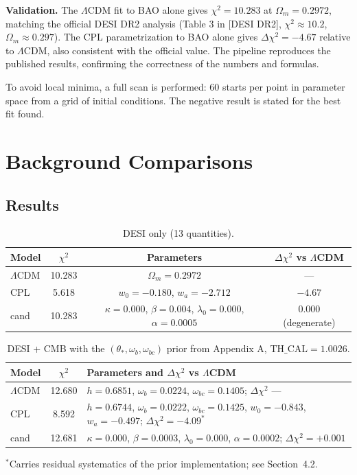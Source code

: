 \documentclass[11pt,a4paper]{article}
\begin{document}
\textbf{Validation.} The $\Lambda$CDM fit to BAO alone gives $\chi^2=10.283$ at $\Omega_m=0.2972$, matching the official DESI DR2 analysis (Table 3 in [DESI DR2], $\chi^2\approx10.2$, $\Omega_m\approx0.297$). The CPL parametrization to BAO alone gives $\Delta\chi^2=-4.67$ relative to $\Lambda$CDM, also consistent with the official value. The pipeline reproduces the published results, confirming the correctness of the numbers and formulas.

To avoid local minima, a full scan is performed: 60 starts per point in parameter space from a grid of initial conditions. The negative result is stated for the best fit found.

\section{Background Comparisons}

\subsection{Results}

\begin{table}[h]
\centering
\small
\caption{DESI only (13 quantities).}
\begin{tabular}{lccc}
\toprule
Model & $\chi^2$ & Parameters & $\Delta\chi^2$ vs $\Lambda$CDM \\
\midrule
$\Lambda$CDM & 10.283 & $\Omega_m=0.2972$ & --- \\
CPL & 5.618 & $w_0=-0.180$, $w_a=-2.712$ & $-4.67$ \\
cand & 10.283 & $\kappa=0.000$, $\beta=0.004$, $\lambda_0=0.000$, $\alpha=0.0005$ & 0.000 (degenerate) \\
\bottomrule
\end{tabular}
\end{table}

\begin{table}[h]
\centering
\small
\caption{DESI + CMB with the $(\theta_*,\omega_b,\omega_{bc})$ prior from Appendix A, $\mathrm{TH\_CAL}=1.0026$.}
\begin{tabular}{lcp{7.5cm}}
\toprule
Model & $\chi^2$ & Parameters and $\Delta\chi^2$ vs $\Lambda$CDM \\
\midrule
$\Lambda$CDM & 12.680 & $h=0.6851$, $\omega_b=0.0224$, $\omega_{bc}=0.1405$; $\Delta\chi^2$ --- \\
CPL & 8.592 & $h=0.6744$, $\omega_b=0.0222$, $\omega_{bc}=0.1425$, $w_0=-0.843$, $w_a=-0.497$; $\Delta\chi^2=-4.09^*$ \\
cand & 12.681 & $\kappa=0.000$, $\beta=0.0003$, $\lambda_0=0.000$, $\alpha=0.0002$; $\Delta\chi^2=+0.001$ \\
\bottomrule
\end{tabular}
\par\smallskip
\footnotesize $^*$Carries residual systematics of the prior implementation; see Section~4.2.
\end{table}
\end{document}
